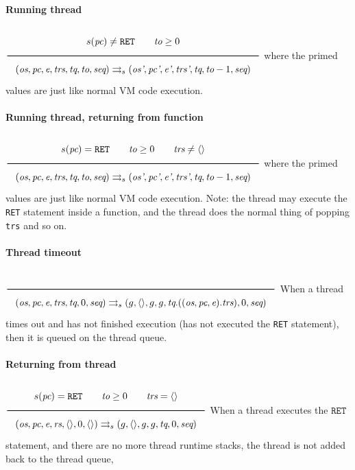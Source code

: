\paragraph{Running thread}
\label{sec:org755c72f}
\(\\\Rule{s(\textit{pc}) \neq \texttt{RET} \qquad \textit{to} \ge 0}{(\textit{os}, \textit{pc}, \textit{e}, \textit{trs}, \textit{tq}, \textit{to}, \textit{seq}) \transition (\textit{os'}, \textit{pc'}, \textit{e'}, \textit{trs'}, \textit{tq}, \textit{to}-1, \textit{seq})}\\\)
where the primed values are just like normal VM code execution.

\paragraph{Running thread, returning from function}
\label{sec:orgcacd3c5}
\(\\\Rule{s(\textit{pc}) = \texttt{RET} \qquad \textit{to} \ge 0 \qquad \textit{trs} \neq \langle \rangle}{(\textit{os}, \textit{pc}, \textit{e}, \textit{trs}, \textit{tq}, \textit{to}, \textit{seq}) \transition (\textit{os'}, \textit{pc'}, \textit{e'}, \textit{trs'}, \textit{tq}, \textit{to}-1, \textit{seq})}\\\)
where the primed values are just like normal VM code execution. Note: the thread may execute the \texttt{RET} statement inside a function, and the thread does the normal thing of popping \texttt{trs} and so on.

\paragraph{Thread timeout}
\label{sec:org2a45ce5}
\(\\\Rule{}{(\textit{os}, \textit{pc}, \textit{e}, \textit{trs}, \textit{tq}, 0, \textit{seq}) \transition (g, \langle \rangle, g, g, \textit{tq}.((\textit{os}, \textit{pc}, \textit{e}).\textit{trs}), 0, \textit{seq})}\\\)
When a thread times out and has not finished execution (has not executed the \texttt{RET} statement), then it is queued on the thread queue.

\paragraph{Returning from thread}
\label{sec:org469c5b0}
\(\\\Rule{s(\textit{pc}) = \texttt{RET} \qquad \textit{to} \ge 0 \qquad \textit{trs} = \langle \rangle}{(\textit{os}, \textit{pc}, \textit{e}, \textit{rs}, \langle \rangle, 0, \langle \rangle) \transition (g, \langle \rangle, g, g, \textit{tq}, 0, \textit{seq})}\\\)
When a thread executes the \(\texttt{RET}\) statement, and there are no more thread runtime stacks, the thread is not added back to the thread queue,

